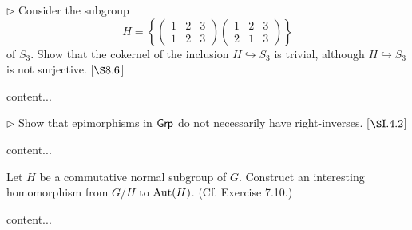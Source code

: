 \begin{exercise}
	$\triangleright$ Consider the subgroup 
	\[
		H = 
		\left\{
		\begin{pmatrix}
			1 & 2& 3 \\
			1 & 2 & 3
		\end{pmatrix}
		\begin{pmatrix}
			1 & 2& 3 \\
			2 & 1 & 3
		\end{pmatrix}
		\right\}
	\]
	of $S_3$. Show that the cokernel of the inclusion $H \hookrightarrow S_3$ is trivial, although $H \hookrightarrow S_3$ is not surjective. [$\S 8.6$]
\end{exercise}
\begin{solution}
	content...
\end{solution}

\begin{exercise}
	$\triangleright$ Show that epimorphisms in $\textsf{Grp}$ do not necessarily have right-inverses. [$\S \RNo{1}. 4.2$]
\end{exercise}
\begin{solution}
	content...
\end{solution}

\begin{exercise}
	Let $H$ be a commutative normal subgroup of $G$. Construct an interesting homomorphism from $G/ H$ to $\operatorname{Aut}(H)$. (Cf. Exercise 7.10.)
\end{exercise}
\begin{solution}
	content...
\end{solution}






